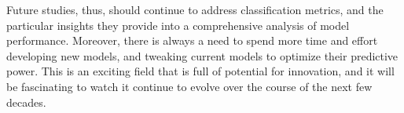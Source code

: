 \documentclass[12pt]{article}
\begin{document}
Future studies, thus, should continue to address classification metrics, and the particular 
insights they provide into a comprehensive analysis of model performance.  Moreover, there is 
always a need to spend more time and effort developing new models, and tweaking current models 
to optimize their predictive power.  This is an exciting field that is full of potential for 
innovation, and it will be fascinating to watch it continue to evolve over the course of the 
next few decades. 



\end{document}
